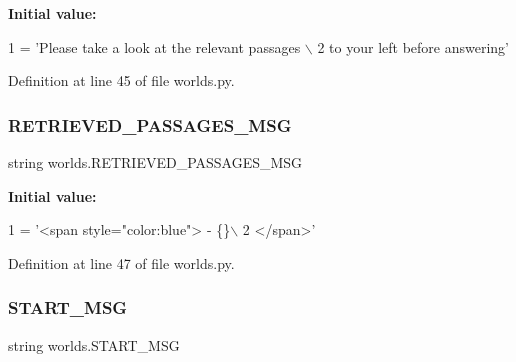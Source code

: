{\bfseries Initial value\+:}
\begin{DoxyCode}
1 =  \textcolor{stringliteral}{'Please take a look at the relevant passages \(\backslash\)}
2 \textcolor{stringliteral}{        to your left before answering'}
\end{DoxyCode}


Definition at line 45 of file worlds.\+py.

\mbox{\label{namespaceworlds_af2e66263c542ed047e1b449268445e63}} 
\subsubsection{\texorpdfstring{R\+E\+T\+R\+I\+E\+V\+E\+D\+\_\+\+P\+A\+S\+S\+A\+G\+E\+S\+\_\+\+M\+SG}{RETRIEVED\_PASSAGES\_MSG}}
{\footnotesize\ttfamily string worlds.\+R\+E\+T\+R\+I\+E\+V\+E\+D\+\_\+\+P\+A\+S\+S\+A\+G\+E\+S\+\_\+\+M\+SG}

{\bfseries Initial value\+:}
\begin{DoxyCode}
1 =  \textcolor{stringliteral}{'<span style="color:blue"> - \{\}\(\backslash\)}
2 \textcolor{stringliteral}{        </span>'}
\end{DoxyCode}


Definition at line 47 of file worlds.\+py.

\mbox{\label{namespaceworlds_aa8939318837861f64b5aac2f59af2be0}} 
\subsubsection{\texorpdfstring{S\+T\+A\+R\+T\+\_\+\+M\+SG}{START\_MSG}}
{\footnotesize\ttfamily string worlds.\+S\+T\+A\+R\+T\+\_\+\+M\+SG}

